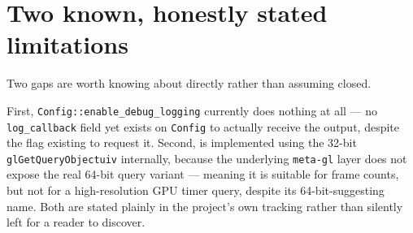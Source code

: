 \section{Two known, honestly stated limitations}

Two gaps are worth knowing about directly rather than assuming closed.

First, \texttt{Config::enable\_debug\_logging} currently does nothing at all --- no
\texttt{log\_callback} field yet exists on \texttt{Config} to actually receive the output,
despite the flag existing to request it. Second,  is
implemented using the 32-bit \texttt{glGetQueryObjectuiv} internally, because the underlying
\texttt{meta-gl} layer does not expose the real 64-bit query variant --- meaning it is
suitable for frame counts, but not for a high-resolution GPU timer query, despite its
64-bit-suggesting name. Both are stated plainly in the project's own tracking rather than
silently left for a reader to discover.
